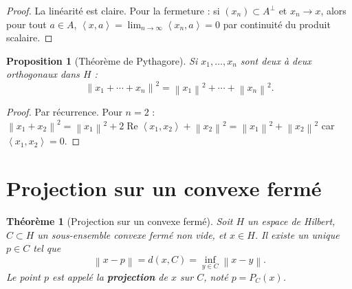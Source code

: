 \documentclass[a4paper,12pt]{book}
\newcommand{\norm}[1]{\left\| #1 \right\|}
\newcommand{\inner}[2]{\left\langle #1, #2 \right\rangle}
\theoremstyle{definition}
\theoremstyle{plain}
\newtheorem{theoreme}[definition]{Théorème}
\newtheorem{proposition}[definition]{Proposition}
\theoremstyle{remark}
\begin{document}
\begin{proof}
La linéarité est claire. Pour la fermeture : si $(x_n) \subset A^\perp$ et $x_n \to x$, alors pour tout $a \in A$, $\inner{x}{a} = \lim_{n\to\infty}\inner{x_n}{a} = 0$ par continuité du produit scalaire.
\end{proof}

\begin{proposition}[Théorème de Pythagore]\label{prop:pythagore}
Si $x_1, \ldots, x_n$ sont deux à deux orthogonaux dans $H$ :
\[
    \norm{x_1 + \cdots + x_n}^2 = \norm{x_1}^2 + \cdots + \norm{x_n}^2.
\]
\end{proposition}

\begin{proof}
Par récurrence. Pour $n = 2$ : $\norm{x_1 + x_2}^2 = \norm{x_1}^2 + 2\operatorname{Re}\inner{x_1}{x_2} + \norm{x_2}^2 = \norm{x_1}^2 + \norm{x_2}^2$ car $\inner{x_1}{x_2} = 0$.
\end{proof}

\section{Projection sur un convexe fermé}

\begin{theoreme}[Projection sur un convexe fermé]\label{thm:proj-convexe}
Soit $H$ un espace de Hilbert, $C \subset H$ un sous-ensemble convexe fermé non vide, et $x \in H$. Il existe un unique $p \in C$ tel que
\[
    \norm{x - p} = d(x, C) = \inf_{y \in C} \norm{x - y}.
\]
Le point $p$ est appelé la \textbf{projection} de $x$ sur $C$, noté $p = P_C(x)$.
\end{theoreme}
\end{document}
